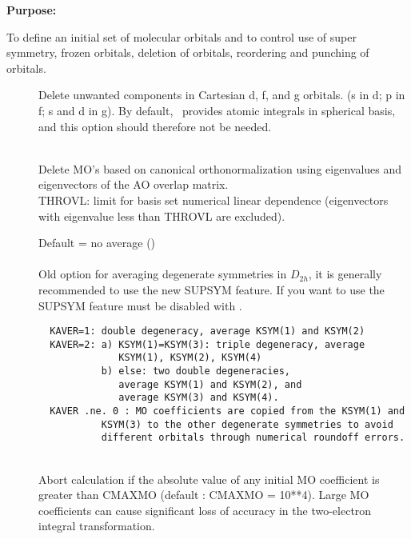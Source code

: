 {\bf Purpose:}
 
To define an initial set of molecular orbitals and to control 
use of super symmetry, frozen
orbitals, deletion of orbitals, 
reordering and punching of orbitals.
 
\begin{description}
\item[]
  Delete unwanted components in Cartesian d, f, and g orbitals.
  (s in d; p in f; s and d in g). By default, \her\ provides atomic
  integrals in spherical basis, and this option should therefore not
  be needed.

\item[]
   \\
  Delete MO's based on canonical orthonormalization using eigenvalues
  and eigenvectors of the AO overlap matrix. \\
  THROVL: limit for basis
  set numerical linear dependence (eigenvectors with eigenvalue less
  than THROVL are excluded).
 
\item[]
  Default = no average ()\\
   \\
  Old option for averaging degenerate symmetries in $D_{2h}$, it is
  generally recommended to use the new SUPSYM feature.
  If you want to use  the SUPSYM
  feature must be disabled with .
\begin{verbatim}
  KAVER=1: double degeneracy, average KSYM(1) and KSYM(2)
  KAVER=2: a) KSYM(1)=KSYM(3): triple degeneracy, average
              KSYM(1), KSYM(2), KSYM(4)
           b) else: two double degeneracies,
              average KSYM(1) and KSYM(2), and
              average KSYM(3) and KSYM(4).
  KAVER .ne. 0 : MO coefficients are copied from the KSYM(1) and
           KSYM(3) to the other degenerate symmetries to avoid
           different orbitals through numerical roundoff errors.
\end{verbatim}
 
\item[]
   \\
  Abort calculation if the absolute value of any initial MO coefficient is
  greater than CMAXMO (default : CMAXMO = 10**4).  Large MO coefficients
  can cause significant loss of accuracy in the two-electron integral
  transformation.
 

\end{description}
